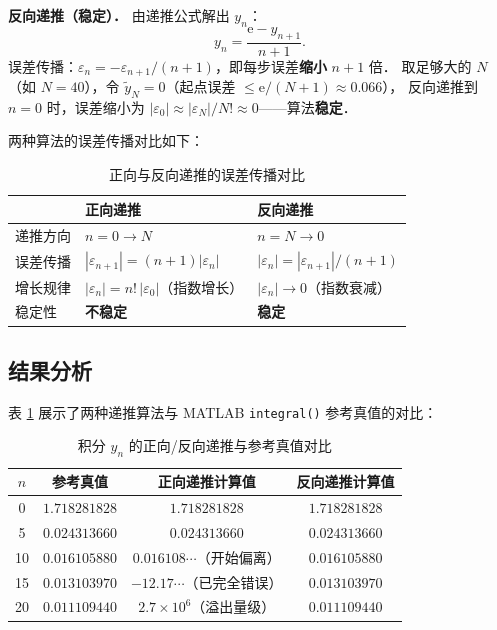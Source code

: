 \documentclass[UTF8,a4paper,11pt]{article}
\begin{document}
\noindent\textbf{反向递推（稳定）．}
由递推公式解出 $y_n$：
$$y_n = \frac{\mathrm{e} - y_{n+1}}{n+1}.$$
误差传播：$\varepsilon_n = -\varepsilon_{n+1}/(n+1)$，即每步误差\textbf{缩小} $n+1$ 倍．
取足够大的 $N$（如 $N=40$），令 $\tilde{y}_N = 0$（起点误差 $\le \mathrm{e}/(N+1) \approx 0.066$），
反向递推到 $n=0$ 时，误差缩小为 $|\varepsilon_0| \approx |\varepsilon_N|/N! \approx 0$——算法\textbf{稳定}．

两种算法的误差传播对比如下：

\begin{table}[H]
\centering
\caption{正向与反向递推的误差传播对比}
\begin{tabular}{lll}
\toprule
 & 正向递推 & 反向递推 \\
\midrule
递推方向 & $n=0 \to N$ & $n=N \to 0$ \\
误差传播 & $|\varepsilon_{n+1}| = (n+1)|\varepsilon_n|$ & $|\varepsilon_n| = |\varepsilon_{n+1}|/(n+1)$ \\
增长规律 & $|\varepsilon_n| = n!\,|\varepsilon_0|$（指数增长） & $|\varepsilon_n| \to 0$（指数衰减） \\
稳定性 & \textbf{不稳定} & \textbf{稳定} \\
\bottomrule
\end{tabular}
\end{table}

\subsection{结果分析}

表 \ref{tab:p3} 展示了两种递推算法与 MATLAB \texttt{integral()} 参考真值的对比：

\begin{table}[H]
\centering
\caption{积分 $y_n$ 的正向/反向递推与参考真值对比}
\label{tab:p3}
\small
\begin{tabular}{cccc}
\toprule
$n$ & 参考真值 & 正向递推计算值 & 反向递推计算值 \\
\midrule
0  & $1.718281828$ & $1.718281828$ & $1.718281828$ \\
5  & $0.024313660$ & $0.024313660$ & $0.024313660$ \\
10 & $0.016105880$ & $0.016108\cdots$（开始偏离） & $0.016105880$ \\
15 & $0.013103970$ & $-12.17\cdots$（已完全错误） & $0.013103970$ \\
20 & $0.011109440$ & $2.7\times10^{6}$（溢出量级） & $0.011109440$ \\
\bottomrule
\end{tabular}
\end{table}
\end{document}
